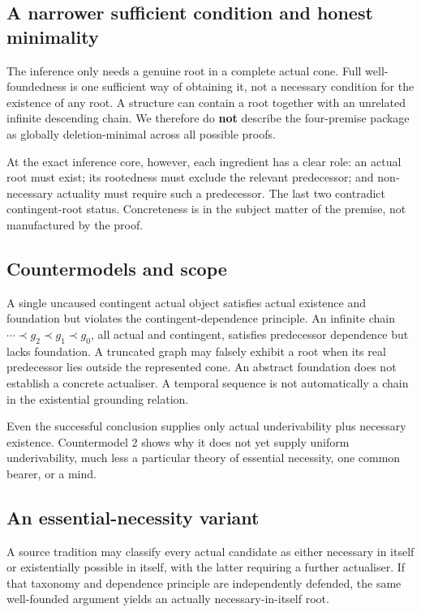 \documentclass[11pt,a4paper]{article}
\begin{document}
\subsection{A narrower sufficient condition and honest
minimality}\label{a-narrower-sufficient-condition-and-honest-minimality}

The inference only needs a genuine root in a complete actual cone. Full
well-foundedness is one sufficient way of obtaining it, not a necessary
condition for the existence of any root. A structure can contain a root
together with an unrelated infinite descending chain. We therefore do
\textbf{not} describe the four-premise package as globally
deletion-minimal across all possible proofs.

At the exact inference core, however, each ingredient has a clear role:
an actual root must exist; its rootedness must exclude the relevant
predecessor; and non-necessary actuality must require such a
predecessor. The last two contradict contingent-root status.
Concreteness is in the subject matter of the premise, not manufactured
by the proof.

\subsection{Countermodels and scope}\label{countermodels-and-scope}

A single uncaused contingent actual object satisfies actual existence
and foundation but violates the contingent-dependence principle. An
infinite chain \(\cdots\prec g_2\prec g_1\prec g_0\), all actual and
contingent, satisfies predecessor dependence but lacks foundation. A
truncated graph may falsely exhibit a root when its real predecessor
lies outside the represented cone. An abstract foundation does not
establish a concrete actualiser. A temporal sequence is not
automatically a chain in the existential grounding relation.

Even the successful conclusion supplies only actual underivability plus
necessary existence. Countermodel 2 shows why it does not yet supply
uniform underivability, much less a particular theory of essential
necessity, one common bearer, or a mind.

\subsection{An essential-necessity
variant}\label{an-essential-necessity-variant}

A source tradition may classify every actual candidate as either
necessary in itself or existentially possible in itself, with the latter
requiring a further actualiser. If that taxonomy and dependence
principle are independently defended, the same well-founded argument
yields an actually necessary-in-itself root.
\end{document}

